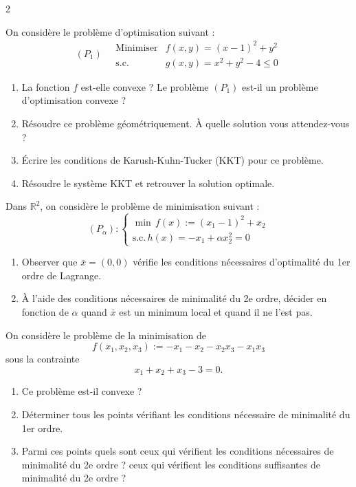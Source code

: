 \begin{multicols}{2}
\begin{exo}
	On considère le problème d'optimisation suivant :
	$$
	(P_1) \quad
	\begin{array}{ll}
	\text{Minimiser} & f(x,y) = (x-1)^2 + y^2 \\
	\text{s.c.} & g(x,y) = x^2 + y^2 - 4 \le 0
	\end{array}
	$$
	\begin{enumerate}[label=\arabic*.]
		\item La fonction $f$ est-elle convexe ? Le problème $(P_1)$ est-il un problème d'optimisation convexe ?
		\item Résoudre ce problème géométriquement. À quelle solution vous attendez-vous ?
		\item Écrire les conditions de Karush-Kuhn-Tucker (KKT) pour ce problème.
		\item Résoudre le système KKT et retrouver la solution optimale.
	\end{enumerate}
\end{exo}

\begin{exo}
	Dans \( \mathbb{R}^2 \), on considère le problème de minimisation suivant :
	\[
	(P_\alpha) :
	\begin{cases}
	\min \,f(x) := (x_1 - 1)^2 + x_2 \\
	\text{s.c.} \, h(x) = -x_1 + \alpha x_2^2 = 0
	\end{cases}
	\]
	\begin{enumerate}[label=\arabic*.,leftmargin=*]
		\item Observer que \( \bar{x} = (0, 0) \) vérifie les conditions nécessaires d’optimalité du 1er ordre de Lagrange.
		\item À l’aide des conditions nécessaires de minimalité du 2e ordre, décider en fonction de \( \alpha \) quand \( \bar{x} \) est un minimum local et quand il ne l’est pas.
	\end{enumerate}
\end{exo}

\begin{exo}
	On considère le problème de la minimisation de
	\[
	f(x_1, x_2, x_3) := -x_1 - x_2 - x_2x_3 - x_1x_3
	\]
	sous la contrainte
	\[
	x_1 + x_2 + x_3 - 3 = 0.
	\]
	\begin{enumerate}[label=\arabic*.,leftmargin=*]
		\item Ce problème est-il convexe ?
		\item Déterminer tous les points vérifiant les conditions nécessaire de minimalité du 1er ordre.
		\item Parmi ces points quels sont ceux qui vérifient les conditions nécessaires de minimalité du 2e ordre ? ceux qui vérifient les conditions suffisantes de minimalité du 2e ordre ?
	\end{enumerate}
\end{exo}


\end{multicols}
